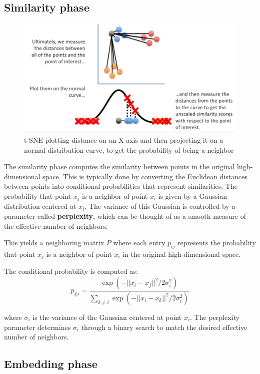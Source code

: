 \subsection{Similarity phase}
\begin{figure}[htbp]
   \centering
   \includegraphics{images/02/tsne.png}
   \caption{t-SNE plotting distance on an X axis and then projecting it on a normal distribution curve, to get the probability of being a neighbor}
   \label{fig:02/tsne}
\end{figure}
The similarity phase computes the similarity between points in the original high-dimensional space. This is typically done by converting the Euclidean distances between points into conditional probabilities that represent similarities. The probability that point $x_j$ is a neighbor of point $x_i$ is given by a Gaussian distribution centered at $x_i$. The variance of this Gaussian is controlled by a parameter called \textbf{perplexity}, which can be thought of as a smooth measure of the effective number of neighbors.

This yields a neighboring matrix $P$ where each entry $p_{ij}$ represents the probability that point $x_j$ is a neighbor of point $x_i$ in the original high-dimensional space.

The conditional probability is computed as:
\[
p_{j|i} = \frac{\exp(-||x_i - x_j||^2 / 2\sigma_i^2)}{\sum_{k \neq i} \exp(-||x_i - x_k||^2 / 2\sigma_i^2)}
\]

where $\sigma_i$ is the variance of the Gaussian centered at point $x_i$. The perplexity parameter determines $\sigma_i$ through a binary search to match the desired effective number of neighbors.

\subsection{Embedding phase}


